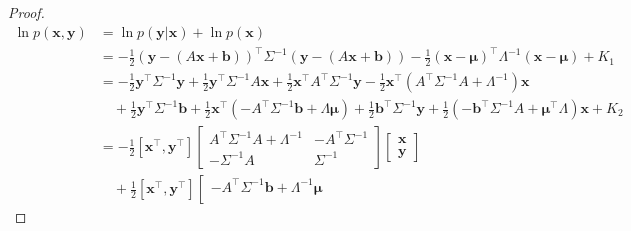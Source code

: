 \begin{proof}

    \begin{align}
        \ln p(\mathbf{x},\mathbf{y})&=\ln p(\mathbf{y}|\mathbf{x})+\ln p(\mathbf{x})\nonumber\\
                                    &=-\frac{1}{2}\left(\mathbf{y}-\left(A\mathbf{x}+\mathbf{b}\right)\right)^\intercal\Sigma^{-1}\left(\mathbf{y}-\left(A\mathbf{x}+\mathbf{b}\right)\right)-\frac{1}{2}\left(\mathbf{x}-\boldsymbol{\mu}\right)^\intercal\Lambda^{-1}\left(\mathbf{x}-\boldsymbol{\mu}\right)+K_1\nonumber\\
                                    &=-\frac{1}{2}\mathbf{y}^\intercal\Sigma^{-1}\mathbf{y}+\frac{1}{2}\mathbf{y}^\intercal\Sigma^{-1}A\mathbf{x}+\frac{1}{2}\mathbf{x}^\intercal A^\intercal\Sigma^{-1}\mathbf{y}-\frac{1}{2}\mathbf{x}^\intercal\left(A^\intercal\Sigma^{-1}A+\Lambda^{-1}\right)\mathbf{x}\nonumber\\
                                    &\quad+\frac{1}{2}\mathbf{y}^\intercal\Sigma^{-1}\mathbf{b}+\frac{1}{2}\mathbf{x}^\intercal(-A^\intercal\Sigma^{-1}\mathbf{b}+\Lambda\boldsymbol{\mu})+\frac{1}{2}\mathbf{b}^\intercal\Sigma^{-1}\mathbf{y}+\frac{1}{2}(-\mathbf{b}^\intercal\Sigma^{-1}A+\boldsymbol{\mu}^\intercal\Lambda)\mathbf{x}+K_2\nonumber\\
                                    &=-\frac{1}{2}[\mathbf{x}^\intercal,\mathbf{y}^\intercal]
                                    \left[\begin{array}{cc}
                                        A^\intercal\Sigma^{-1}A+\Lambda^{-1}&-A^\intercal\Sigma^{-1}\nonumber\\
                                        -\Sigma^{-1}A&\Sigma^{-1}
                                    \end{array}\right]\left[\begin{array}{c}
                                                                \mathbf{x}\nonumber\\
                                                                \mathbf{y}
                                                            \end{array}\right]\nonumber\\
                                    &\quad+\frac{1}{2}[\mathbf{x}^\intercal,\mathbf{y}^\intercal]
                                    \left[\begin{array}{c}
                                        -A^\intercal\Sigma^{-1}\mathbf{b}+\Lambda^{-1}\boldsymbol{\mu}\\

\end{array}
\end{align}
\end{proof}
